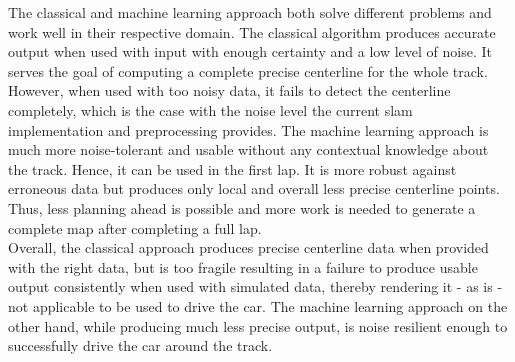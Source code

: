 The classical and machine learning approach both solve different problems and work well in their respective domain. The classical algorithm produces accurate output when used with input with enough certainty and a low level of noise. It serves the goal of computing a complete precise centerline for the whole track. However, when used with too noisy data, it fails to detect the centerline completely, which is the case with the noise level the current \ac{slam} implementation and preprocessing provides. The machine learning approach is much more noise-tolerant and usable without any contextual knowledge about the track. Hence, it can be used in the first lap. It is more robust against erroneous data but produces only local and overall less precise centerline points. Thus, less planning ahead is possible and more work is needed to generate a complete map after completing a full lap.\\
Overall, the classical approach produces precise centerline data when provided with the right data, but is too fragile resulting in a failure to produce usable output consistently when used with simulated data, thereby rendering it - as is - not applicable to be used to drive the car. The machine learning approach on the other hand, while producing much less precise output, is noise resilient enough to successfully drive the car around the track.

